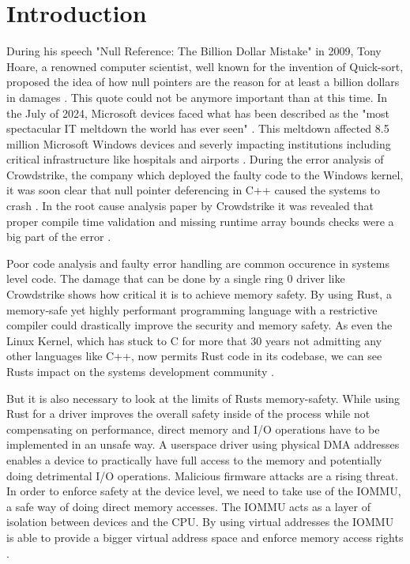\chapter{Introduction}\label{c:introduction}

During his speech "Null Reference: The Billion Dollar Mistake" in 2009, Tony Hoare, a renowned computer scientist, well known for the invention of Quick-sort, proposed the idea of how null pointers are the reason for at least a billion dollars in damages \cite{billiondollarmistake}. This quote could not be anymore important than at this time. In the July of 2024, Microsoft devices faced what has been described as the "most spectacular IT meltdown the world has ever seen" \cite{bloombergmeltdown}. This meltdown affected 8.5 million Microsoft Windows devices and severly impacting institutions including critical infrastructure like hospitals and airports \cite{bloomberg8milliondevices}. During the error analysis of Crowdstrike, the company which deployed the faulty code to the Windows kernel, it was soon clear that null pointer deferencing in C++ caused the systems to crash \cite{heisenullpointer}. In the root cause analysis paper by Crowdstrike it was revealed that proper compile time validation and missing runtime array bounds checks were a big part of the error \cite{crowdstrikerca}.

Poor code analysis and faulty error handling are common occurence in systems level code. The damage that can be done by a single ring 0 driver like Crowdstrike shows how critical it is to achieve memory safety. By using Rust, a memory-safe yet highly performant programming language with a restrictive compiler could drastically improve the security and memory safety. As even the Linux Kernel, which has stuck to C for more that 30 years not admitting any other languages like C++, now permits Rust code in its codebase, we can see Rusts impact on the systems development community \cite{linuxrustpull}.

But it is also necessary to look at the limits of Rusts memory-safety. While using Rust for a driver improves the overall safety inside of the process while not compensating on performance, direct memory and I/O operations have to be implemented in an unsafe way. A userspace driver using physical DMA addresses enables a device to practically have full access to the memory and potentially doing detrimental I/O operations. Malicious firmware attacks are a rising threat.
In order to enforce safety at the device level, we need to take use of the IOMMU, a safe way of doing direct memory accesses. The IOMMU acts as a layer of isolation between devices and the CPU. By using virtual addresses the IOMMU is able to provide a bigger virtual address space and enforce memory access rights \cite{OLS2007}.


